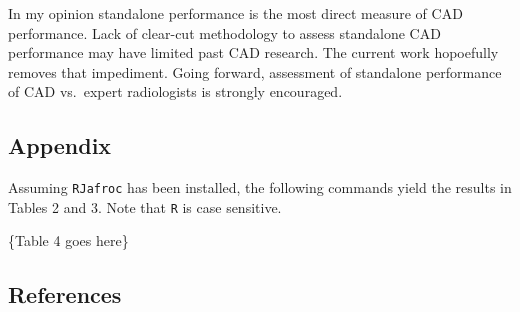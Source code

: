 \documentclass[
]{article}
\begin{document}
In my opinion standalone performance is the most direct measure of CAD performance. Lack of clear-cut methodology to assess standalone CAD performance may have limited past CAD research. The current work hopoefully removes that impediment. Going forward, assessment of standalone performance of CAD vs.~expert radiologists is strongly encouraged.

\hypertarget{standalone-cad-radiologists-appendix}{%
\subsection{Appendix}\label{standalone-cad-radiologists-appendix}}

Assuming \texttt{RJafroc} has been installed, the following commands yield the results in Tables 2 and 3. Note that \texttt{R} is case sensitive.

\{Table 4 goes here\}

\hypertarget{standalone-cad-radiologists-references}{%
\subsection{References}\label{standalone-cad-radiologists-references}}
\end{document}
